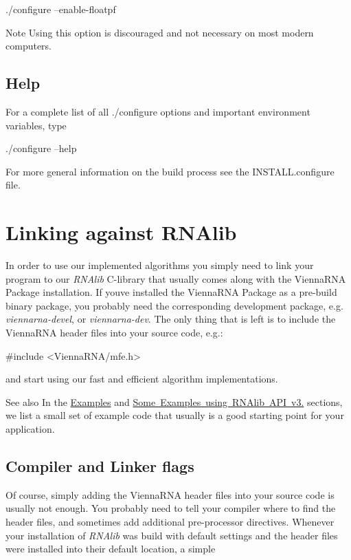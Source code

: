 \begin{DoxyVerb}./configure --enable-floatpf
\end{DoxyVerb}


\begin{DoxyNote}{Note}
Using this option is discouraged and not necessary on most modern computers.
\end{DoxyNote}
\hypertarget{install_config_help}{}\subsection{Help}\label{install_config_help}
For a complete list of all ./configure options and important environment variables, type

\begin{DoxyVerb}./configure --help
\end{DoxyVerb}


For more general information on the build process see the I\+N\+S\+T\+A\+L\+L.\+configure file.\hypertarget{install_linking}{}\section{Linking against R\+N\+Alib}\label{install_linking}
In order to use our implemented algorithms you simply need to link your program to our {\itshape R\+N\+Alib} C-\/library that usually comes along with the Vienna\+R\+NA Package installation. If you\textquotesingle{}ve installed the Vienna\+R\+NA Package as a pre-\/build binary package, you probably need the corresponding development package, e.\+g. {\itshape viennarna-\/devel}, or {\itshape viennarna-\/dev}. The only thing that is left is to include the Vienna\+R\+NA header files into your source code, e.\+g.\+:

\begin{DoxyVerb}#include <ViennaRNA/mfe.h>
\end{DoxyVerb}


and start using our fast and efficient algorithm implementations.

\begin{DoxySeeAlso}{See also}
In the \mbox{\hyperlink{mp_example}{Examples}} and \mbox{\hyperlink{newAPI_newAPI_examples}{Some Examples using R\+N\+Alib A\+PI v3.}} sections, we list a small set of example code that usually is a good starting point for your application.
\end{DoxySeeAlso}
\hypertarget{install_linking_flags}{}\subsection{Compiler and Linker flags}\label{install_linking_flags}
Of course, simply adding the Vienna\+R\+NA header files into your source code is usually not enough. You probably need to tell your compiler where to find the header files, and sometimes add additional pre-\/processor directives. Whenever your installation of {\itshape R\+N\+Alib} was build with default settings and the header files were installed into their default location, a simple

